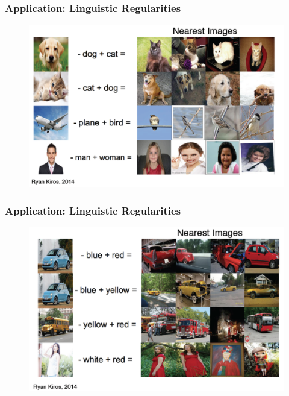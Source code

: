 \documentclass{beamer}
\begin{document}
\begin{frame}
\frametitle{Application: Linguistic Regularities}
\begin{figure}
      \includegraphics[width=1\textwidth]{figs/exp1.png}
\end{figure}
\end{frame}

\begin{frame}
\frametitle{Application: Linguistic Regularities}
\begin{figure}
      \includegraphics[width=1\textwidth]{figs/exp2.png}
\end{figure}
\end{frame}
\end{document}
